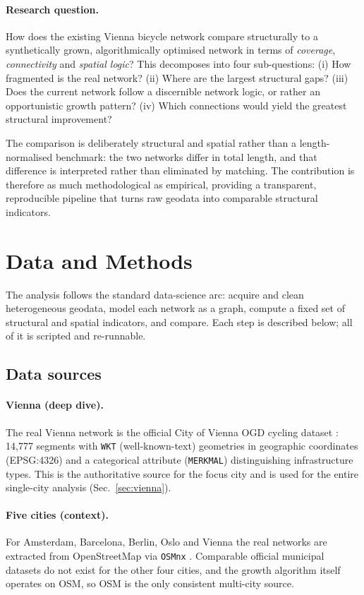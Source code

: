 \documentclass[11pt,a4paper]{article}
\begin{document}
\paragraph{Research question.} How does the existing Vienna bicycle network compare
structurally to a synthetically grown, algorithmically optimised network in terms of
\emph{coverage}, \emph{connectivity} and \emph{spatial logic}? This decomposes into four
sub-questions: (i) How fragmented is the real network? (ii) Where are the largest
structural gaps? (iii) Does the current network follow a discernible network logic, or
rather an opportunistic growth pattern? (iv) Which connections would yield the greatest
structural improvement?

The comparison is deliberately structural and spatial rather than a length-normalised
benchmark: the two networks differ in total length, and that difference is interpreted
rather than eliminated by matching. The contribution is therefore as much methodological
as empirical, providing a transparent, reproducible pipeline that turns raw geodata into
comparable structural indicators.

\section{Data and Methods}

The analysis follows the standard data-science arc: acquire and clean heterogeneous
geodata, model each network as a graph, compute a fixed set of structural and spatial
indicators, and compare. Each step is described below; all of it is scripted and
re-runnable.

\subsection{Data sources}

\paragraph{Vienna (deep dive).} The real Vienna network is the official City of Vienna OGD
cycling dataset \citep{viennaogd}: 14{,}777 segments with \texttt{WKT} (well-known-text)
geometries in geographic coordinates (EPSG:4326) and a categorical attribute
(\texttt{MERKMAL}) distinguishing infrastructure types. This is the authoritative source
for the focus city and is used for the entire single-city analysis (Sec.~\ref{sec:vienna}).

\paragraph{Five cities (context).} For Amsterdam, Barcelona, Berlin, Oslo and Vienna the
real networks are extracted from OpenStreetMap \citep{osm} via \texttt{OSMnx}
\citep{boeing2017}. Comparable official municipal datasets do not exist for the other four
cities, and the growth algorithm itself operates on OSM, so OSM is the only consistent
multi-city source.
\end{document}
